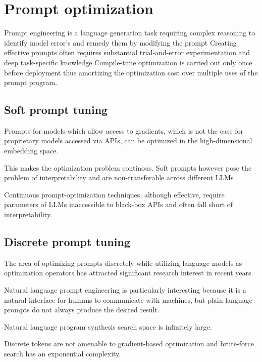 \section{Prompt optimization}
Prompt engineering is a language generation task requiring complex reasoning to identify model error's and remedy them by modifying the prompt \cite{ye2024promptengineeringpromptengineer}
Creating effective prompts often requires substantial trial-and-error experimentation and deep task-specific knowledge \cite{xiang2025selfsupervisedpromptoptimization}
Compile-time optimization is carried out only once before deployment thus amortizing the optimization cost over multiple uses of the prompt program. \cite{schnabel2024symbolicpromptprogramsearch}

\subsection{Soft prompt tuning}
Prompts for models which allow access to gradients, which is not the case for proprietary models accessed via APIs, can be optimized in the high-dimensional embedding space.

This makes the optimization problem continous. Soft prompts however pose the problem of interpretability and are non-transferable across different LLMs \cite{deng2022rlpromptoptimizingdiscretetext}.

Continuous prompt-optimization techniques, although effective, require parameters of LLMs inaccessible to black-box APIs and often fall short of interpretability. \cite{guo2024connectinglargelanguagemodels}

\subsection{Discrete prompt tuning}
The area of optimizing prompts discretely while utilizing language models as optimization operators has attracted significant research interest in recent years.

Natural language prompt engineering is particularly interesting because it is a natural interface for humans to communicate with machines, but plain language prompts do not always produce the desired result. \cite{zhou2023largelanguagemodelshumanlevel}

Natural language program synthesis search space is infinitely large. \cite{zhou2023largelanguagemodelshumanlevel}

Discrete tokens are not amenable to gradient-based optimization and brute-force search has an exponential complexity. \cite{deng2022rlpromptoptimizingdiscretetext}

